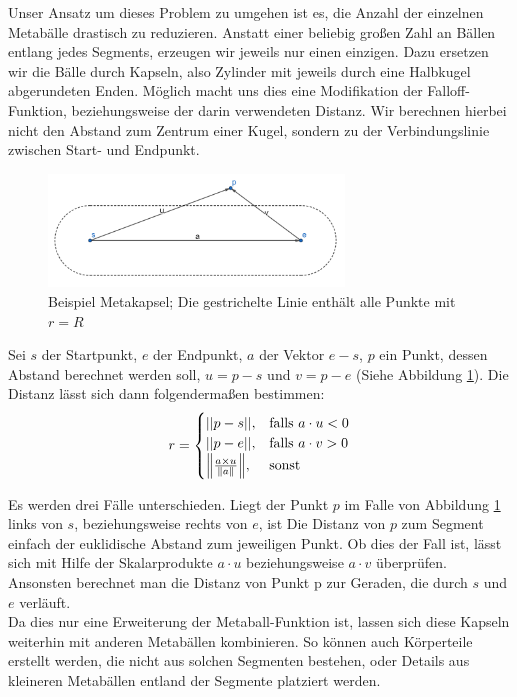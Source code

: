 Unser Ansatz um dieses Problem zu umgehen ist es, die Anzahl der einzelnen Metabälle drastisch zu reduzieren. Anstatt einer beliebig großen Zahl an Bällen entlang jedes Segments, erzeugen wir jeweils nur einen einzigen. Dazu ersetzen wir die Bälle durch Kapseln, also Zylinder mit jeweils durch eine Halbkugel abgerundeten Enden. Möglich macht uns dies eine Modifikation der Falloff-Funktion, beziehungsweise der darin verwendeten Distanz. Wir berechnen hierbei nicht den Abstand zum Zentrum einer Kugel, sondern zu der Verbindungslinie zwischen Start- und Endpunkt. \\

\begin{figure}[ht]
\centering
\includegraphics[width=0.7\textwidth]{resources/img/metacapsule.png}
\caption{Beispiel Metakapsel; Die gestrichelte Linie enthält alle Punkte mit $r=R$}
\label{metacapsule}
\end{figure}

Sei $s$ der Startpunkt, $e$ der Endpunkt, $a$ der Vektor $e-s$, $p$ ein Punkt, dessen Abstand berechnet werden soll, $u=p-s$ und $v=p-e$ (Siehe Abbildung \ref{metacapsule}). Die Distanz lässt sich dann folgendermaßen bestimmen:
\[
    r= 
\begin{cases}
    ||p-s||,& \text{falls } a\cdot u < 0\\
    ||p-e||,& \text{falls } a\cdot v > 0\\
    \norm*{\frac{a\times u}{\norm{a}}},& \text{sonst}
\end{cases}
\]

Es werden drei Fälle unterschieden. Liegt der Punkt $p$ im Falle von Abbildung \ref{metacapsule} links von $s$, beziehungsweise rechts von $e$, ist Die Distanz von $p$ zum Segment einfach der euklidische Abstand zum jeweiligen Punkt. Ob dies der Fall ist, lässt sich mit Hilfe der Skalarprodukte $a\cdot u$ beziehungsweise $a\cdot v$ überprüfen. Ansonsten berechnet man die Distanz von Punkt p zur Geraden, die durch $s$ und $e$ verläuft.\\

Da dies nur eine Erweiterung der Metaball-Funktion ist, lassen sich diese Kapseln weiterhin mit anderen Metabällen kombinieren. So können auch Körperteile erstellt werden, die nicht aus solchen Segmenten bestehen, oder Details aus kleineren Metabällen entland der Segmente platziert werden.




